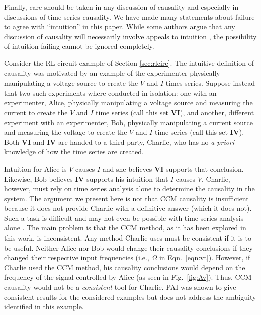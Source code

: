 \documentclass[twocolumn,aps,pre,groupedaddress]{revtex4-1}
\begin{document}
Finally, care should be taken in any discussion of causality and especially in discussions of time series causality.  We have made many statements about failure to agree with ``intuition'' in this paper.  While some authors argue that any discussion of causality will necessarily involve appeals to intuition \cite{Pearl2000}, the possibility of intuition failing cannot be ignored completely.  

Consider the RL circuit example of Section \ref{sec:rlcirc}.  The intuitive definition of causality was motivated by an example of the experimenter physically manipulating a voltage source to create the $V$ and $I$ times series.  Suppose instead that two such experiments where conducted in isolation: one with an experimenter, Alice, physically manipulating a voltage source and measuring the current to create the $V$ and $I$ time series (call this set $\mathbf{VI}$), and another, different experiment with an experimenter, Bob, physically manipulating a current source and measuring the voltage to create the $V$ and $I$ time series (call this set $\mathbf{IV}$).  Both $\mathbf{VI}$ and $\mathbf{IV}$ are handed to a third party, Charlie, who has no {\em a priori} knowledge of how the time series are created.

Intuition for Alice is $V$ causes $I$ and she believes $\mathbf{VI}$ supports that conclusion.  Likewise, Bob believes $\mathbf{IV}$ supports his intuition that $I$ causes $V$.  Charlie, however, must rely on time series analysis alone to determine the causality in the system.  The argument we present here is not that CCM causality is insufficient because it does not provide Charlie with a definitive answer (which it does not).  Such a task is difficult and may not even be possible with time series analysis alone \cite{Pearl2000}.  The main problem is that the CCM method, as it has been explored in this work, is inconsistent.  Any method Charlie uses must be consistent if it is to be useful.  Neither Alice nor Bob would change their causality conclusions if they changed their respective input frequencies (i.e., $\Omega$ in Eqn.\ \ref{eqn:vt}).  However, if Charlie used the CCM method, his causality conclusions would depend on the frequency of the signal controlled by Alice (as seen in Fig.\ \ref{fig:Av}).  Thus, CCM causality would not be a {\em consistent} tool for Charlie.  PAI was shown to give consistent results for the considered examples but does not address the ambiguity identified in this example.

%

\end{document}
